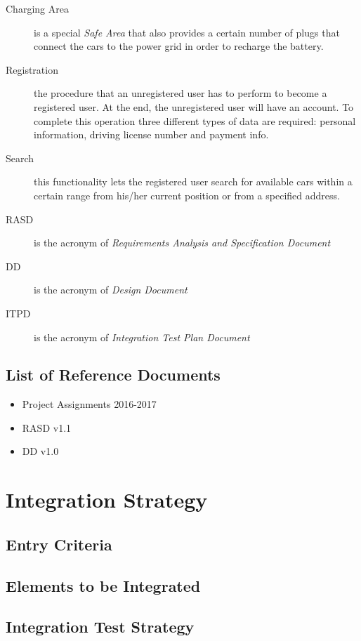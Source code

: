 \documentclass[11pt,a4paper]{report}
\begin{document}
\begin{description}
	\item[Charging Area] is a special \textit{Safe Area} that also provides a certain number of plugs that connect the cars to the power grid in order to recharge the battery.
	\item[Registration] the procedure that an unregistered user has to perform to become a registered user. At the end, the unregistered user will have an account. To complete this operation three different types of data are required: personal information, driving license number and payment info.
	\item[Search] this functionality lets the registered user search for available cars within a certain range from his/her current position or from a specified address.
	\item[RASD] is the acronym of \textit{Requirements Analysis and Specification Document}
	\item[DD] is the acronym of \textit{Design Document}
	\item[ITPD] is the acronym of \textit{Integration Test Plan Document}
\end{description}
\section{List of Reference Documents}
	\begin{itemize}
		\item Project Assignments 2016-2017
		\item RASD v1.1
		\item DD v1.0
	\end{itemize}
\chapter{Integration Strategy}
\section{Entry Criteria}
\section{Elements to be Integrated}
\section{Integration Test Strategy}
\end{document}
